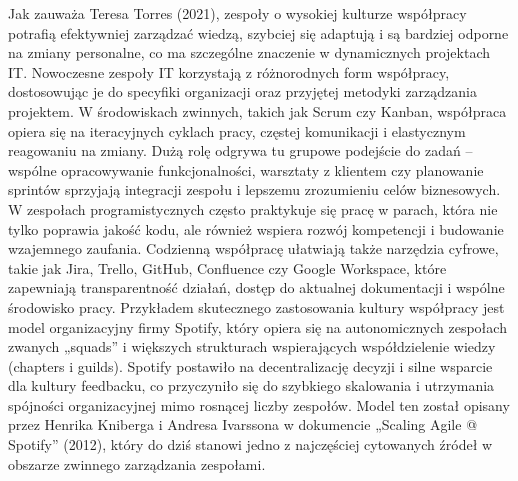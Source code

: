 Jak zauważa Teresa Torres (2021), zespoły o wysokiej kulturze współpracy potrafią efektywniej zarządzać wiedzą, szybciej się adaptują i są bardziej odporne na zmiany personalne, co ma szczególne znaczenie w dynamicznych projektach IT. Nowoczesne zespoły IT korzystają z różnorodnych form współpracy, dostosowując je do specyfiki organizacji oraz przyjętej metodyki zarządzania projektem. W środowiskach zwinnych, takich jak Scrum czy Kanban, współpraca opiera się na iteracyjnych cyklach pracy, częstej komunikacji i elastycznym reagowaniu na zmiany. Dużą rolę odgrywa tu grupowe podejście do zadań – wspólne opracowywanie funkcjonalności, warsztaty z klientem czy planowanie sprintów sprzyjają integracji zespołu i lepszemu zrozumieniu celów biznesowych. W zespołach programistycznych często praktykuje się pracę w parach, która nie tylko poprawia jakość kodu, ale również wspiera rozwój kompetencji i budowanie wzajemnego zaufania. Codzienną współpracę ułatwiają także narzędzia cyfrowe, takie jak Jira, Trello, GitHub, Confluence czy Google Workspace, które zapewniają transparentność działań, dostęp do aktualnej dokumentacji i wspólne środowisko pracy. Przykładem skutecznego zastosowania kultury współpracy jest model organizacyjny firmy Spotify, który opiera się na autonomicznych zespołach zwanych „squads” i większych strukturach wspierających współdzielenie wiedzy (chapters i guilds). Spotify postawiło na decentralizację decyzji i silne wsparcie dla kultury feedbacku, co przyczyniło się do szybkiego skalowania i utrzymania spójności organizacyjnej mimo rosnącej liczby zespołów. Model ten został opisany przez Henrika Kniberga i Andresa Ivarssona w dokumencie „Scaling Agile @ Spotify” (2012), który do dziś stanowi jedno z najczęściej cytowanych źródeł w obszarze zwinnego zarządzania zespołami. 
